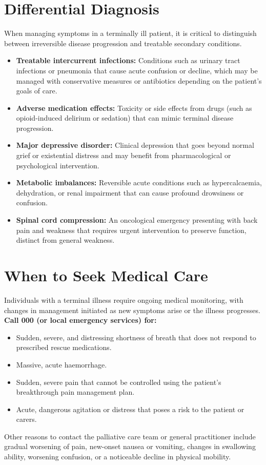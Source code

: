 \section*{Differential Diagnosis}
When managing symptoms in a terminally ill patient, it is critical to distinguish between irreversible disease progression and treatable secondary conditions.
\begin{itemize}
    \item \textbf{Treatable intercurrent infections:} Conditions such as urinary tract infections or pneumonia that cause acute confusion or decline, which may be managed with conservative measures or antibiotics depending on the patient's goals of care.
    \item \textbf{Adverse medication effects:} Toxicity or side effects from drugs (such as opioid-induced delirium or sedation) that can mimic terminal disease progression.
    \item \textbf{Major depressive disorder:} Clinical depression that goes beyond normal grief or existential distress and may benefit from pharmacological or psychological intervention.
    \item \textbf{Metabolic imbalances:} Reversible acute conditions such as hypercalcaemia, dehydration, or renal impairment that can cause profound drowsiness or confusion.
    \item \textbf{Spinal cord compression:} An oncological emergency presenting with back pain and weakness that requires urgent intervention to preserve function, distinct from general weakness.
\end{itemize}

\section*{When to Seek Medical Care}
Individuals with a terminal illness require ongoing medical monitoring, with changes in management initiated as new symptoms arise or the illness progresses.
\textbf{Call 000 (or local emergency services) for:}
\begin{itemize}
    \item Sudden, severe, and distressing shortness of breath that does not respond to prescribed rescue medications.
    \item Massive, acute haemorrhage.
    \item Sudden, severe pain that cannot be controlled using the patient's breakthrough pain management plan.
    \item Acute, dangerous agitation or distress that poses a risk to the patient or carers.
\end{itemize}
Other reasons to contact the palliative care team or general practitioner include gradual worsening of pain, new-onset nausea or vomiting, changes in swallowing ability, worsening confusion, or a noticeable decline in physical mobility.

